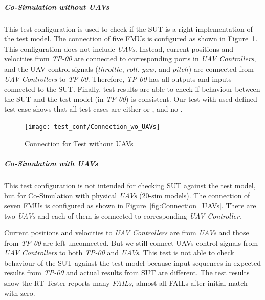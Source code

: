 %
%
%

\subparagraph{Co-Simulation without UAVs}
This test configuration is used to check if the SUT is a right implementation of the test model. The connection of five FMUs is configured as shown in Figure~\ref{fig:Connection_wo_UAVs}. This configuration does not include \emph{UAVs}. Instead, current positions and velocities from \emph{TP-00} are connected to corresponding ports in \emph{UAV Controllers}, and the UAV control signals ($throttle$, $roll$, $yaw$, and $pitch$) are connected from \emph{UAV Controllers} to \emph{TP-00}. Therefore, \emph{TP-00} has all outputs and inputs connected to the SUT. Finally, test results are able to check if behaviour between the SUT and the test model (in \emph{TP-00}) is consistent. Our test with used defined test case shows that all test cases are either  or , and no . 

\begin{figure}[htb!]
    \centering
	\texttt{[image: test\_conf/Connection\_wo\_UAVs]}
    \caption{Connection for Test without UAVs}
    \label{fig:Connection_wo_UAVs}
\end{figure}

\subparagraph{Co-Simulation with UAVs}
This test configuration is not intended for checking SUT against the test model, but for Co-Simulation with physical \emph{UAVs} (20-sim models). The connection of seven FMUs is configured as shown in Figure~\ref{fig:Connection_UAVs}. There are two \emph{UAVs} and each of them is connected to corresponding \emph{UAV Controller}. 

Current positions and velocities to \emph{UAV Controllers} are from \emph{UAVs} and those from \emph{TP-00} are left unconnected. But we still connect UAVs control signals from \emph{UAV Controllers} to both \emph{TP-00} and \emph{UAVs}. This test is not able to check behaviour of the SUT against the test model because input sequences in expected results from \emph{TP-00} and actual results from SUT are different. %
The test results show the RT Tester reports many \emph{FAILs}, almost all \textrm{FAILs} after initial match with zero.  


